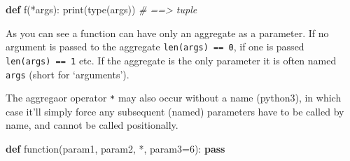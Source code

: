 \documentclass[ignorenonframetext,]{beamer}
\newenvironment{Shaded}{}{}
\newcommand{\KeywordTok}[1]{\textcolor[rgb]{0.00,0.44,0.13}{\textbf{{#1}}}}
\newcommand{\DataTypeTok}[1]{\textcolor[rgb]{0.56,0.13,0.00}{{#1}}}
\newcommand{\DecValTok}[1]{\textcolor[rgb]{0.25,0.63,0.44}{{#1}}}
\newcommand{\CommentTok}[1]{\textcolor[rgb]{0.38,0.63,0.69}{\textit{{#1}}}}
\newcommand{\NormalTok}[1]{{#1}}
\begin{document}
\begin{frame}[fragile]

\begin{Shaded}
\begin{Highlighting}[]
\KeywordTok{def} \NormalTok{f(*args):}
    \DataTypeTok{print}\NormalTok{(}\DataTypeTok{type}\NormalTok{(args)) }\CommentTok{# ==> tuple}
\end{Highlighting}
\end{Shaded}

As you can see a function can have only an aggregate as a parameter. If
no argument is passed to the aggregate \texttt{len(args)\ ==\ 0}, if one
is passed \texttt{len(args)\ ==\ 1} etc. If the aggregate is the only
parameter it is often named \texttt{args} (short for `arguments').

\end{frame}

\begin{frame}[fragile]

The aggregaor operator \texttt{*} may also occur without a name
(python3), in which case it'll simply force any subsequent (named)
parameters have to be called by name, and cannot be called positionally.

\begin{Shaded}
\begin{Highlighting}[]
\KeywordTok{def} \NormalTok{function(param1, param2, *, param3=}\DecValTok{6}\NormalTok{):}
    \KeywordTok{pass}
\end{Highlighting}
\end{Shaded}

\end{frame}
\end{document}
